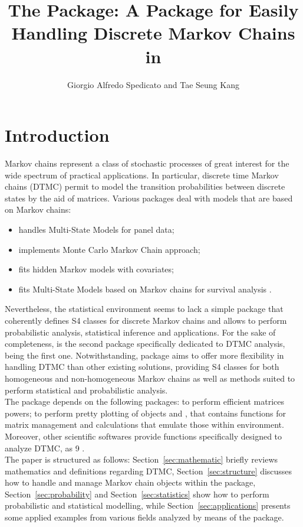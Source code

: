 \documentclass[nojss]{jss}
\author{Giorgio Alfredo Spedicato and Tae Seung Kang}
\title{The \pkg{markovchain} Package: A Package for Easily Handling Discrete
Markov Chains in \proglang{R}}
\begin{document}



\maketitle

\section{Introduction}
Markov chains represent a class of stochastic processes of great interest for the wide spectrum of practical applications.
In particular, discrete time Markov chains (DTMC) permit to model the transition probabilities between discrete states by the aid of matrices.
Various  packages deal with models that are based on Markov chains:
\begin{itemize}
\item {} \citep{msmR} handles Multi-State Models for panel data;
\item {} \citep{mcmcR} implements Monte Carlo Markov Chain approach;  \item {} \citep{hmmR} fits hidden Markov models with covariates;
\item {} fits 
Multi-State Models based on Markov chains for survival analysis \citep{mstateR}.
\end{itemize}
Nevertheless, the  statistical environment \citep{rSoftware} seems to lack a simple package that coherently defines S4 classes for discrete Markov chains and allows to perform probabilistic analysis, statistical inference and
applications. For the sake of completeness,  is the second package specifically dedicated to DTMC analysis, being  \citep{DTMCPackR} the first one. Notwithstanding,  package \citep{markovchainR} aims to offer
more flexibility in handling DTMC than other existing
solutions, providing S4 classes for both homogeneous and non-homogeneous Markov chains as well as methods suited to perform statistical and probabilistic analysis.\\
The  package depends on the following  packages:  \citep{expmR} to perform efficient matrices powers;  \citep{pkg:igraph} to perform pretty plotting of  objects and  \citep{pkg:matlab}, that contains functions for matrix management and calculations that emulate those within  environment.
Moreover, other scientific softwares provide functions specifically designed
to analyze DTMC, as  9 \citep{mathematica9}.\\
The paper is structured as follows:
Section~\ref{sec:mathematic} briefly reviews mathematics and 
definitions regarding DTMC, Section~\ref{sec:structure}
discusses how to handle and manage Markov chain objects within the package,
Section~\ref{sec:probability} and Section~\ref{sec:statistics} show how to
perform probabilistic and statistical modelling, while
Section~\ref{sec:applications} presents some applied examples from various
fields analyzed by means of the  package.
\end{document}
